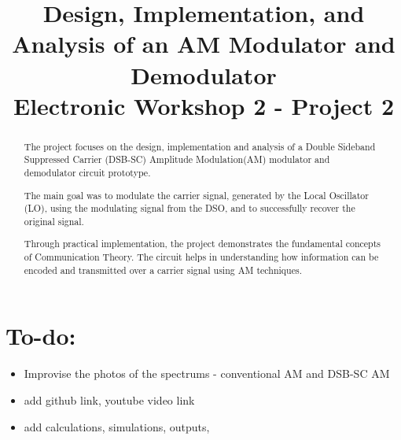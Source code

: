 \documentclass[conference]{IEEEtran}
\begin{document}
\title{Design, Implementation, and Analysis of an AM Modulator and Demodulator\\
{\Large Electronic Workshop 2 - Project 2}
}


\author{
\and
{}
}
\maketitle

\begin{abstract}

The project focuses on the design, implementation and analysis of a Double Sideband Suppressed Carrier (DSB-SC) Amplitude Modulation(AM) modulator and demodulator circuit prototype.

The main goal was to modulate the carrier signal, generated by the Local Oscillator (LO), using the modulating signal from the DSO, and to successfully recover the original signal.

Through practical implementation, the project demonstrates the fundamental concepts of Communication Theory. The circuit helps in understanding how information can be encoded and transmitted over a carrier signal using AM techniques.
\end{abstract}

\section{To-do: }
\begin{itemize}
    \item Improvise the photos of the spectrums - conventional AM and DSB-SC AM
    \item add github link, youtube video link
    \item add calculations, simulations, outputs, 
    
\end{itemize}
\end{document}
